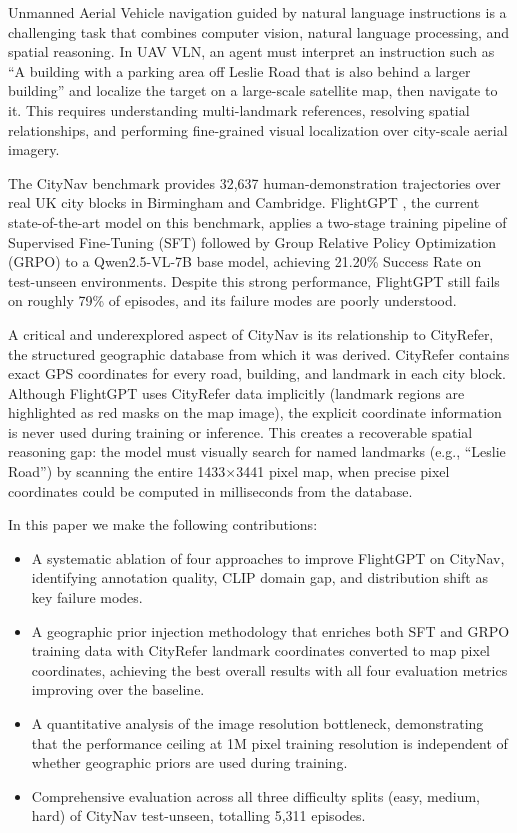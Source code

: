 \documentclass[conference]{IEEEtran}
\begin{document}
Unmanned Aerial Vehicle navigation guided by natural language instructions is a challenging task that combines computer vision, natural language processing, and spatial reasoning. In UAV VLN, an agent must interpret an instruction such as ``A building with a parking area off Leslie Road that is also behind a larger building'' and localize the target on a large-scale satellite map, then navigate to it. This requires understanding multi-landmark references, resolving spatial relationships, and performing fine-grained visual localization over city-scale aerial imagery.

The CityNav benchmark \cite{citynav} provides 32,637 human-demonstration trajectories over real UK city blocks in Birmingham and Cambridge. FlightGPT \cite{flightgpt}, the current state-of-the-art model on this benchmark, applies a two-stage training pipeline of Supervised Fine-Tuning (SFT) followed by Group Relative Policy Optimization (GRPO) \cite{deepseekr1} to a Qwen2.5-VL-7B \cite{qwen25vl} base model, achieving 21.20\% Success Rate on test-unseen environments. Despite this strong performance, FlightGPT still fails on roughly 79\% of episodes, and its failure modes are poorly understood.

A critical and underexplored aspect of CityNav is its relationship to CityRefer, the structured geographic database from which it was derived. CityRefer contains exact GPS coordinates for every road, building, and landmark in each city block. Although FlightGPT uses CityRefer data implicitly (landmark regions are highlighted as red masks on the map image), the explicit coordinate information is never used during training or inference. This creates a recoverable spatial reasoning gap: the model must visually search for named landmarks (e.g., ``Leslie Road'') by scanning the entire 1433$\times$3441 pixel map, when precise pixel coordinates could be computed in milliseconds from the database.

In this paper we make the following contributions:

\begin{itemize}
    \item A systematic ablation of four approaches to improve FlightGPT on CityNav, identifying annotation quality, CLIP domain gap, and distribution shift as key failure modes.
    \item A geographic prior injection methodology that enriches both SFT and GRPO training data with CityRefer landmark coordinates converted to map pixel coordinates, achieving the best overall results with all four evaluation metrics improving over the baseline.
    \item A quantitative analysis of the image resolution bottleneck, demonstrating that the performance ceiling at 1M pixel training resolution is independent of whether geographic priors are used during training.
    \item Comprehensive evaluation across all three difficulty splits (easy, medium, hard) of CityNav test-unseen, totalling 5,311 episodes.
\end{itemize}
\end{document}
